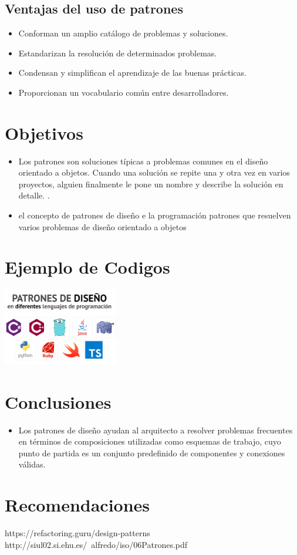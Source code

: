\documentclass[twoside,twocolumn]{article}
\begin{document}
\subsection{Ventajas del uso de patrones}

\begin{itemize}
	\item Conforman un amplio catálogo de problemas y soluciones.
	\item Estandarizan la resolución de determinados problemas.
	\item Condensan y simplifican el aprendizaje de las buenas prácticas.
	\item Proporcionan un vocabulario común entre desarrolladores.
	
\end{itemize}

\section{Objetivos}

\begin{itemize}
\item  Los patrones son soluciones típicas a problemas comunes en el diseño orientado a objetos. Cuando una solución se repite una y otra vez en varios proyectos, alguien finalmente le pone un nombre y describe la solución en detalle. .
\item el concepto de patrones de diseño e la programación
patrones que resuelven varios problemas de diseño orientado a objetos
\end{itemize}
\section{Ejemplo de Codigos}
\begin{center}
	\includegraphics[width=5cm]{./Imagenes/1} 
\end{center}



\section{Conclusiones}\label{sec:6}
\begin{itemize}
	\item Los patrones de diseño ayudan al arquitecto a resolver problemas frecuentes en términos de composiciones utilizadas como esquemas de trabajo, cuyo punto de partida es un conjunto predefinido de componentes y conexiones válidas.
\end{itemize}
\section{Recomendaciones}\label{sec:7}




https://refactoring.guru/design-patterns
http://siul02.si.ehu.es/~alfredo/iso/06Patrones.pdf
\end{document}
